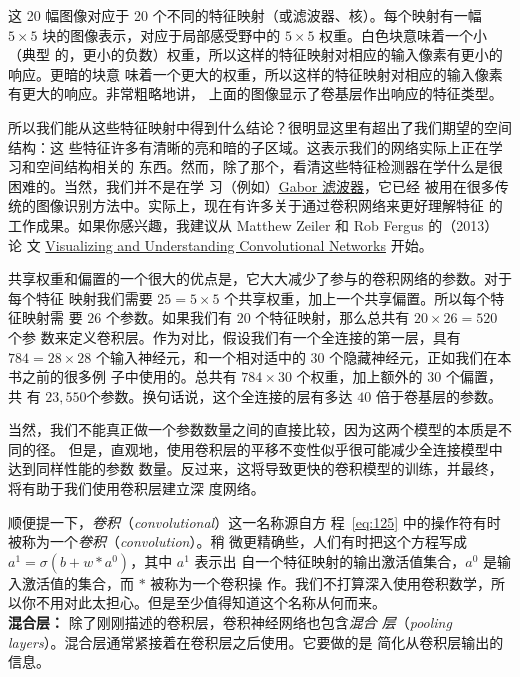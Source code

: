 这 20 幅图像对应于 20 个不同的特征映射（或滤波器、核）。每个映射有一幅 $5 \times
5$ 块的图像表示，对应于局部感受野中的 $5 \times 5$ 权重。白色块意味着一个小（典型
的，更小的负数）权重，所以这样的特征映射对相应的输入像素有更小的响应。更暗的块意
味着一个更大的权重，所以这样的特征映射对相应的输入像素有更大的响应。非常粗略地讲，
上面的图像显示了卷基层作出响应的特征类型。

所以我们能从这些特征映射中得到什么结论？很明显这里有超出了我们期望的空间结构：这
些特征许多有清晰的亮和暗的子区域。这表示我们的网络实际上正在学习和空间结构相关的
东西。然而，除了那个，看清这些特征检测器在学什么是很困难的。当然，我们并不是在学
习（例如）\href{http://en.wikipedia.org/wiki/Gabor_filter}{Gabor 滤波器}，它已经
被用在很多传统的图像识别方法中。实际上，现在有许多关于通过卷积网络来更好理解特征
的工作成果。如果你感兴趣，我建议从 Matthew Zeiler 和 Rob Fergus 的（2013）论
文 \href{http://arxiv.org/abs/1311.2901}{Visualizing and Understanding
  Convolutional Networks} 开始。

共享权重和偏置的一个很大的优点是，它大大减少了参与的卷积网络的参数。对于每个特征
映射我们需要 $25 = 5 \times 5$ 个共享权重，加上一个共享偏置。所以每个特征映射需
要 $26$ 个参数。如果我们有 $20$ 个特征映射，那么总共有 $20 \times 26 = 520$ 个参
数来定义卷积层。作为对比，假设我们有一个全连接的第一层，具有 $784 = 28 \times
28$ 个输入神经元，和一个相对适中的 $30$ 个隐藏神经元，正如我们在本书之前的很多例
子中使用的。总共有 $784 \times 30$ 个权重，加上额外的 $30$ 个偏置，共
有 $23,550$个参数。换句话说，这个全连接的层有多达 $40$ 倍于卷基层的参数。

当然，我们不能真正做一个参数数量之间的直接比较，因为这两个模型的本质是不同的径。
但是，直观地，使用卷积层的平移不变性似乎很可能减少全连接模型中达到同样性能的参数
数量。反过来，这将导致更快的卷积模型的训练，并最终，将有助于我们使用卷积层建立深
度网络。

顺便提一下，\emph{卷积}（\textit{convolutional}）这一名称源自方
程~\eqref{eq:125} 中的操作符有时被称为一个\emph{卷积}（\textit{convolution}）。稍
微更精确些，人们有时把这个方程写成 $a^1 = \sigma(b + w * a^0)$，其中 $a^1$ 表示出
自一个特征映射的输出激活值集合，$a^0$ 是输入激活值的集合，而 $*$ 被称为一个卷积操
作。我们不打算深入使用卷积数学，所以你不用对此太担心。但是至少值得知道这个名称从何而来。
\\

\textbf{混合层：} 除了刚刚描述的卷积层，卷积神经网络也包含\emph{混合
  层}（\textit{pooling layers}）。混合层通常紧接着在卷积层之后使用。它要做的是
简化从卷积层输出的信息。

